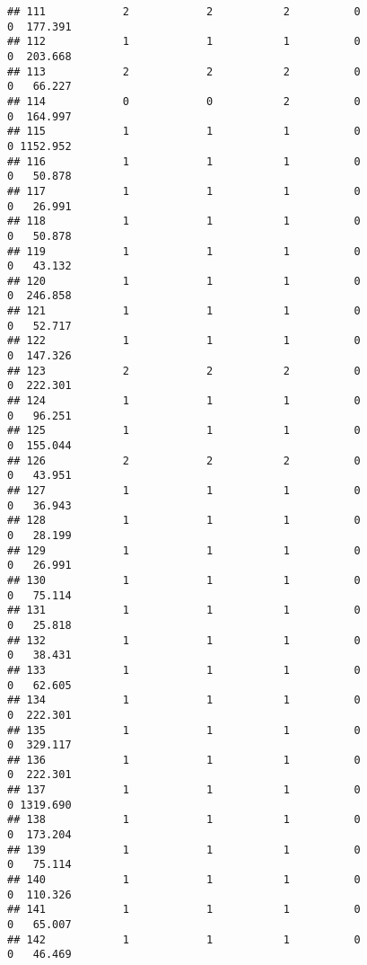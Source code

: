 \documentclass[
]{article}
\begin{document}
\begin{verbatim}
## 111            2            2           2          0                0  177.391
## 112            1            1           1          0                0  203.668
## 113            2            2           2          0                0   66.227
## 114            0            0           2          0                0  164.997
## 115            1            1           1          0                0 1152.952
## 116            1            1           1          0                0   50.878
## 117            1            1           1          0                0   26.991
## 118            1            1           1          0                0   50.878
## 119            1            1           1          0                0   43.132
## 120            1            1           1          0                0  246.858
## 121            1            1           1          0                0   52.717
## 122            1            1           1          0                0  147.326
## 123            2            2           2          0                0  222.301
## 124            1            1           1          0                0   96.251
## 125            1            1           1          0                0  155.044
## 126            2            2           2          0                0   43.951
## 127            1            1           1          0                0   36.943
## 128            1            1           1          0                0   28.199
## 129            1            1           1          0                0   26.991
## 130            1            1           1          0                0   75.114
## 131            1            1           1          0                0   25.818
## 132            1            1           1          0                0   38.431
## 133            1            1           1          0                0   62.605
## 134            1            1           1          0                0  222.301
## 135            1            1           1          0                0  329.117
## 136            1            1           1          0                0  222.301
## 137            1            1           1          0                0 1319.690
## 138            1            1           1          0                0  173.204
## 139            1            1           1          0                0   75.114
## 140            1            1           1          0                0  110.326
## 141            1            1           1          0                0   65.007
## 142            1            1           1          0                0   46.469

\end{verbatim}
\end{document}
